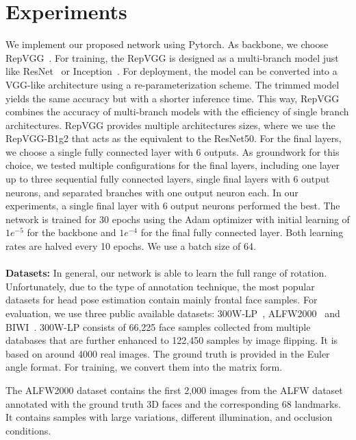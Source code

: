 \documentclass{article}
\begin{document}
\section{Experiments}
\label{sec:experiments}
We implement our proposed network using Pytorch. As backbone, we choose RepVGG~\cite{Ding2021RepVGGMV}. For training, the RepVGG is designed as a multi-branch model just like ResNet~\cite{7780459} or Inception~\cite{7298594}. For deployment, the model can be converted into a VGG-like architecture using a re-parameterization scheme. The trimmed model yields the same accuracy but with a shorter inference time. This way, RepVGG combines the accuracy of multi-branch models with the efficiency of single branch architectures. RepVGG provides multiple architectures sizes, where we use the RepVGG-B1g2 that acts as the equivalent to the ResNet50. For the final layers, we choose a single fully connected layer with 6 outputs. As groundwork for this choice, we tested multiple configurations for the final layers, including one layer up to three sequential fully connected layers, single final layers with 6 output neurons, and separated branches with one output neuron each. In our experiments, a single final layer with 6 output neurons performed the best. The network is trained for 30 epochs using the Adam optimizer with initial learning of $1e^{-5}$ for the backbone and $1e^{-4}$ for the final fully connected layer. Both learning rates are halved every 10 epochs. We use a batch size of 64.  
\\
\\

\textbf{Datasets:} 
In general, our network is able to learn the full range of rotation. Unfortunately, due to the type of annotation technique, the most popular datasets for head pose estimation contain mainly frontal face samples.
For evaluation, we use three public available datasets: 300W-LP~\cite{Zhu2016FaceAA}, ALFW2000~\cite{7298679} and BIWI~\cite{FDGF12}. 
300W-LP consists of 66,225 face samples collected from multiple databases that are further enhanced to 122,450 samples by image flipping. It is based on around 4000 real images. The ground truth is provided in the Euler angle format. For training, we convert them into the matrix form.

The ALFW2000 dataset contains the first 2,000 images from the ALFW dataset annotated with the ground truth 3D faces and the corresponding 68 landmarks. It contains samples with large variations, different illumination, and occlusion conditions.
\end{document}
